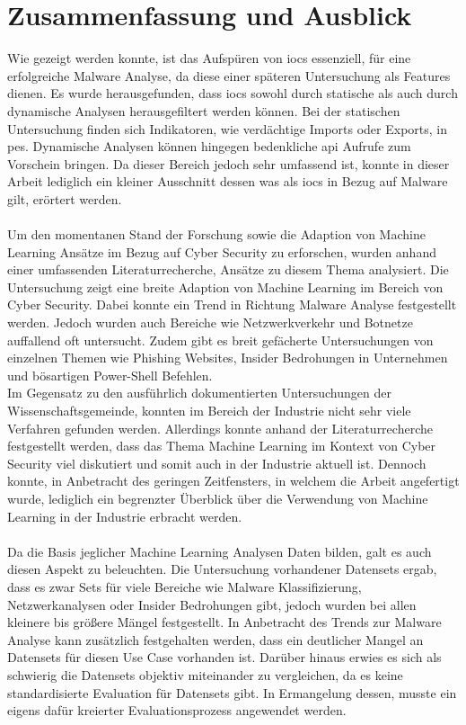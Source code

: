 \documentclass[
    12pt, %
    DIV10,
    ngerman, %
    a4paper, %
    oneside, %
    titlepage, %
    parskip=half, %
    headings=normal, %
    listof=totoc, %
    bibliography=totoc, %
    index=totoc, %
    captions=tableheading, %
    final %
]{scrreprt}
\begin{document}
\chapter{Zusammenfassung und Ausblick}
Wie gezeigt werden konnte, ist das Aufspüren von \ac{iocs} essenziell, für eine erfolgreiche Malware Analyse, da diese einer späteren Untersuchung als Features dienen.
Es wurde herausgefunden, dass \ac{iocs} sowohl durch statische als auch durch dynamische Analysen herausgefiltert werden können. Bei der statischen Untersuchung finden sich Indikatoren, wie verdächtige Imports oder Exports, in \ac{pes}. Dynamische Analysen können hingegen bedenkliche \ac{api} Aufrufe zum Vorschein bringen. Da dieser Bereich jedoch sehr umfassend ist, konnte in dieser Arbeit lediglich ein kleiner Ausschnitt dessen was als \ac{iocs} in Bezug auf Malware gilt, erörtert werden.\\\\
Um den momentanen Stand der Forschung sowie die Adaption von Machine Learning Ansätze im Bezug auf Cyber Security zu erforschen, wurden anhand einer umfassenden Literaturrecherche, Ansätze zu diesem Thema analysiert. Die Untersuchung zeigt eine breite Adaption von Machine Learning im Bereich von Cyber Security. Dabei konnte ein Trend in Richtung Malware Analyse festgestellt werden. Jedoch wurden auch Bereiche wie Netzwerkverkehr und Botnetze auffallend oft untersucht. Zudem gibt es breit gefächerte Untersuchungen von einzelnen Themen wie Phishing Websites, Insider Bedrohungen in Unternehmen und bösartigen Power-Shell Befehlen.\\
Im Gegensatz zu den ausführlich dokumentierten Untersuchungen der Wissenschaftsgemeinde, konnten im Bereich der Industrie nicht sehr viele Verfahren gefunden werden. Allerdings konnte anhand der Literaturrecherche festgestellt werden, dass das Thema Machine Learning im Kontext von Cyber Security viel diskutiert und somit auch in der Industrie aktuell ist. Dennoch konnte, in Anbetracht des geringen Zeitfensters, in welchem die Arbeit angefertigt wurde, lediglich ein begrenzter Überblick über die Verwendung von Machine Learning in der Industrie erbracht werden.\\\\
Da die Basis jeglicher Machine Learning Analysen Daten bilden, galt es auch diesen Aspekt zu beleuchten. Die Untersuchung vorhandener Datensets ergab, dass es zwar Sets für viele Bereiche wie Malware Klassifizierung, Netzwerkanalysen oder Insider Bedrohungen gibt, jedoch wurden bei allen kleinere bis grö{\ss}ere Mängel festgestellt. In Anbetracht des Trends zur Malware Analyse kann zusätzlich festgehalten werden, dass ein deutlicher Mangel an Datensets für diesen Use Case vorhanden ist. Darüber hinaus erwies es sich als schwierig die Datensets objektiv miteinander zu vergleichen, da es keine standardisierte Evaluation für Datensets gibt. In Ermangelung dessen, musste ein eigens dafür kreierter Evaluationsprozess angewendet werden.\\\\
\end{document}
